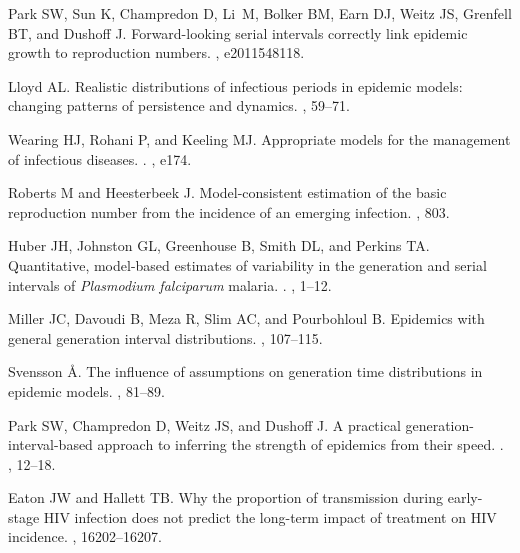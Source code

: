 \documentclass[12pt]{article}
\begin{document}
\begin{thebibliography}{10}
Park SW, Sun K, Champredon D, Li~M, Bolker BM, Earn DJ, Weitz JS, Grenfell BT,
  and Dushoff J.
 Forward-looking serial intervals correctly link epidemic growth
  to reproduction numbers.
, e2011548118.

Lloyd AL.
 Realistic distributions of infectious periods in epidemic
  models: changing patterns of persistence and dynamics.
, 59--71.

Wearing HJ, Rohani P, and Keeling MJ.
 Appropriate models for the management of infectious diseases.
.
, e174.

Roberts M and Heesterbeek J.
 Model-consistent estimation of the basic reproduction number
  from the incidence of an emerging infection.
, 803.

Huber JH, Johnston GL, Greenhouse B, Smith DL, and Perkins TA.
 Quantitative, model-based estimates of variability in the
  generation and serial intervals of \textit{Plasmodium falciparum} malaria.
.
, 1--12.

Miller JC, Davoudi B, Meza R, Slim AC, and Pourbohloul B.
 Epidemics with general generation interval distributions.
, 107--115.

Svensson {\AA}.
 The influence of assumptions on generation time distributions in
  epidemic models.
, 81--89.

Park SW, Champredon D, Weitz JS, and Dushoff J.
 A practical generation-interval-based approach to inferring the
  strength of epidemics from their speed.
.
, 12--18.

Eaton JW and Hallett TB.
 Why the proportion of transmission during early-stage {HIV}
  infection does not predict the long-term impact of treatment on {HIV}
  incidence.
, 16202--16207.


\end{thebibliography}
\end{document}
